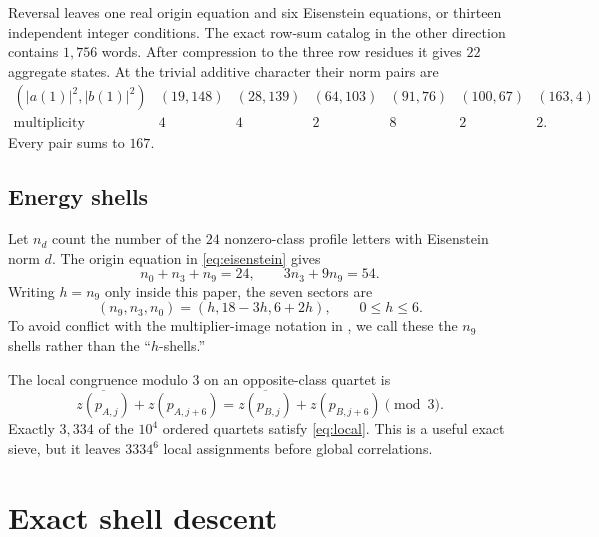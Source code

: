 \documentclass[11pt]{article}
\theoremstyle{remark}
\begin{document}
Reversal leaves one real origin equation and six Eisenstein equations, or
thirteen independent integer conditions.  The exact row-sum catalog in the
other direction contains $1{,}756$ words.  After compression to the three
row residues it gives $22$ aggregate states.  At the trivial additive
character their norm pairs are
\[
\begin{array}{c|rrrrrr}
(|a(1)|^2,|b(1)|^2)&(19,148)&(28,139)&(64,103)&(91,76)&(100,67)&(163,4)\\
\hline
\text{multiplicity}&4&4&2&8&2&2.
\end{array}
\]
Every pair sums to $167$.

\subsection{Energy shells}

Let $n_d$ count the number of the $24$ nonzero-class profile letters with
Eisenstein norm $d$.  The origin equation in \eqref{eq:eisenstein} gives
\[
 n_0+n_3+n_9=24,\qquad 3n_3+9n_9=54.
\]
Writing $h=n_9$ only inside this paper, the seven sectors are
\begin{equation}
 (n_9,n_3,n_0)=(h,18-3h,6+2h),\qquad 0\leq h\leq6.
 \label{eq:shells}
\end{equation}
To avoid conflict with the multiplier-image notation in
\cite{ramos2026}, we call these the $n_9$ shells rather than the
``$h$-shells.''

The local congruence modulo $3$ on an opposite-class quartet is
\begin{equation}
 \overline{z(p_{A,j})}+z(p_{A,j+6})
 =
 \overline{z(p_{B,j})}+z(p_{B,j+6})
 \pmod 3.
 \label{eq:local}
\end{equation}
Exactly $3{,}334$ of the $10^4$ ordered quartets satisfy
\eqref{eq:local}.  This is a useful exact sieve, but it leaves
$3334^6$ local assignments before global correlations.

\section{Exact shell descent}
\label{sec:shells}
\end{document}
